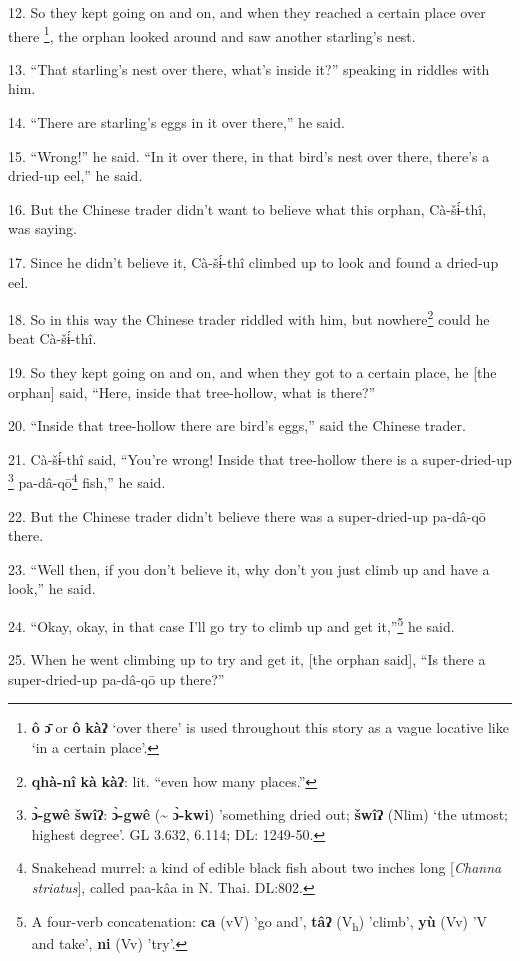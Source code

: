 12. So they kept going on and on, and when they reached a certain place over there
\footnote{\textbf{ô} \textbf{ɔ̄} or \textbf{ô} \textbf{kàʔ} `over there' is used throughout this story as a vague locative like `in a certain place'.}, the orphan looked around and saw another starling's nest.

13. ``That starling's nest over there, what's inside it?'' speaking in riddles
with him.

14. ``There are starling's eggs in it over there,'' he said.

15. ``Wrong!'' he said. ``In it over there, in that bird's nest over there, there's
a dried-up eel,'' he said.

16. But the Chinese trader didn't want to believe what this orphan, Cà-šɨ́-thî,
was saying.

17. Since he didn't believe it, Cà-šɨ́-thî climbed up to look and found a
dried-up eel.

18. So in this way the Chinese trader riddled with him, but nowhere\footnote{\textbf{qhà-nî} \textbf{kà} \textbf{kàʔ}: lit. ``even how many places.''} could he
beat Cà-šɨ́-thî.

19. So they kept going on and on, and when they got to a certain place, he [the
orphan] said, ``Here, inside that tree-hollow, what is there?''

20. ``Inside that tree-hollow there are bird's eggs,'' said the Chinese trader.

21. Cà-šɨ́-thî said, ``You're wrong! Inside that tree-hollow there is a super-dried-up
\footnote{\textbf{ɔ̀-gwê} \textbf{šwîʔ}: \textbf{ɔ̀-gwê} (\textasciitilde{} \textbf{ɔ̀-kwi}) 'something dried out; \textbf{šwîʔ} (Nlim) `the utmost; highest degree'. GL 3.632, 6.114; DL: 1249-50.} pa-dâ-qō\footnote{Snakehead murrel: a kind of edible black fish about two inches long [\textit{Channa striatus}], called paa-kâa in N. Thai. DL:802.} fish,'' he said.

22. But the Chinese trader didn't believe there was a super-dried-up pa-dâ-qō
there.

23. ``Well then, if you don't believe it, why don't you just climb up and have
a look,'' he said.

24. ``Okay, okay, in that case I'll go try to climb up and get it,''\footnote{A four-verb concatenation: \textbf{ca} (vV) 'go and', \textbf{tâʔ} (V\textsubscript{h}) 'climb', \textbf{yù} (Vv) 'V and take', \textbf{ni} (Vv) 'try'.} he said.

25. When he went climbing up to try and get it, [the orphan said], ``Is there a
super-dried-up pa-dâ-qō up there?''

